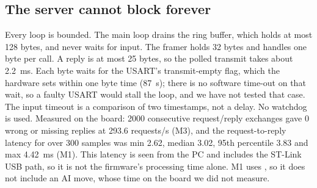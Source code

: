 \subsection{The server cannot block forever}
Every loop is bounded. The main loop drains the ring buffer, which holds at most 128 bytes, and never waits for input. The framer holds 32 bytes and handles one byte per call. A reply is at most 25 bytes, so the polled transmit
takes about 2.2~ms. Each byte waits for the USART's transmit-empty flag, which the hardware sets within one byte time (87~\textmu s); there is no software time-out on that wait, so a faulty USART would stall the loop, and we have not tested that case. The input timeout is a comparison of two timestamps, not a delay. No watchdog is used. Measured on the board: 2000 consecutive request/reply exchanges gave 0 wrong or missing replies at 293.6 requests/s (M3), and the request-to-reply latency for  over 300 samples was min 2.62, median 3.02, 95th percentile 3.83 and max 4.42~ms (M1). This latency is seen from the PC and includes the ST-Link USB path, so it is not the firmware's processing time alone. M1 uses , so it does not include an AI move, whose time on the board we did not measure.
